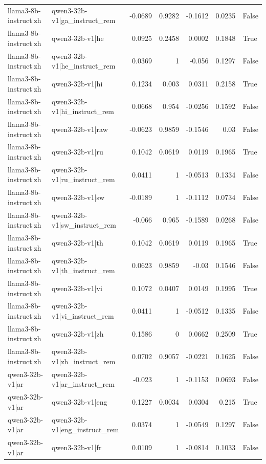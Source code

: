 \begin{table}
\begin{tabular}{l l r r r r l}
llama3-8b-instruct|zh & qwen3-32b-v1|ga_instruct_rem & -0.0689 & 0.9282 & -0.1612 & 0.0235 & False \\
llama3-8b-instruct|zh & qwen3-32b-v1|he & 0.0925 & 0.2458 & 0.0002 & 0.1848 & True \\
llama3-8b-instruct|zh & qwen3-32b-v1|he_instruct_rem & 0.0369 & 1 & -0.056 & 0.1297 & False \\
llama3-8b-instruct|zh & qwen3-32b-v1|hi & 0.1234 & 0.003 & 0.0311 & 0.2158 & True \\
llama3-8b-instruct|zh & qwen3-32b-v1|hi_instruct_rem & 0.0668 & 0.954 & -0.0256 & 0.1592 & False \\
llama3-8b-instruct|zh & qwen3-32b-v1|raw & -0.0623 & 0.9859 & -0.1546 & 0.03 & False \\
llama3-8b-instruct|zh & qwen3-32b-v1|ru & 0.1042 & 0.0619 & 0.0119 & 0.1965 & True \\
llama3-8b-instruct|zh & qwen3-32b-v1|ru_instruct_rem & 0.0411 & 1 & -0.0513 & 0.1334 & False \\
llama3-8b-instruct|zh & qwen3-32b-v1|sw & -0.0189 & 1 & -0.1112 & 0.0734 & False \\
llama3-8b-instruct|zh & qwen3-32b-v1|sw_instruct_rem & -0.066 & 0.965 & -0.1589 & 0.0268 & False \\
llama3-8b-instruct|zh & qwen3-32b-v1|th & 0.1042 & 0.0619 & 0.0119 & 0.1965 & True \\
llama3-8b-instruct|zh & qwen3-32b-v1|th_instruct_rem & 0.0623 & 0.9859 & -0.03 & 0.1546 & False \\
llama3-8b-instruct|zh & qwen3-32b-v1|vi & 0.1072 & 0.0407 & 0.0149 & 0.1995 & True \\
llama3-8b-instruct|zh & qwen3-32b-v1|vi_instruct_rem & 0.0411 & 1 & -0.0512 & 0.1335 & False \\
llama3-8b-instruct|zh & qwen3-32b-v1|zh & 0.1586 & 0 & 0.0662 & 0.2509 & True \\
llama3-8b-instruct|zh & qwen3-32b-v1|zh_instruct_rem & 0.0702 & 0.9057 & -0.0221 & 0.1625 & False \\
qwen3-32b-v1|ar & qwen3-32b-v1|ar_instruct_rem & -0.023 & 1 & -0.1153 & 0.0693 & False \\
qwen3-32b-v1|ar & qwen3-32b-v1|eng & 0.1227 & 0.0034 & 0.0304 & 0.215 & True \\
qwen3-32b-v1|ar & qwen3-32b-v1|eng_instruct_rem & 0.0374 & 1 & -0.0549 & 0.1297 & False \\
qwen3-32b-v1|ar & qwen3-32b-v1|fr & 0.0109 & 1 & -0.0814 & 0.1033 & False \\

\end{tabular}
\end{table}
